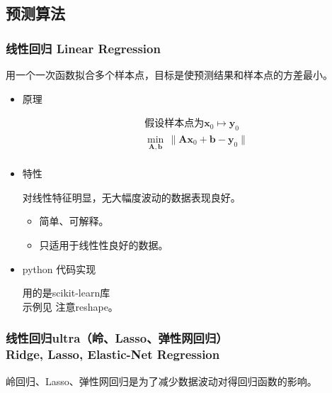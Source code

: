 \documentclass{article}
\begin{document}
\newpage



\subsection{预测算法}

\subsubsection{线性回归 Linear Regression}

用一个一次函数拟合多个样本点，目标是使预测结果和样本点的方差最小。

\begin{itemize}

\item{原理}

\begin{equation}
    \begin{split}
        & \text{假设样本点为$\mathbf{x}_0 \mapsto \mathbf{y}_0$}  \\
        &\min_\mathbf{A, b} \, \lVert \mathbf{Ax}_0 + \mathbf{b} - \mathbf{y}_0 \rVert \\
    \end{split}
\end{equation}

\item{特性}

对线性特征明显，无大幅度波动的数据表现良好。

\begin{itemize}
    \item 简单、可解释。
    \item 只适用于线性性良好的数据。
\end{itemize}

\item{python 代码实现}

用的是scikit-learn库\\
示例见
注意reshape。

\end{itemize}

\subsubsection{线性回归ultra（岭、Lasso、弹性网回归）\\ Ridge, Lasso, Elastic-Net Regression}

岭回归、Lasso、弹性网回归是为了减少数据波动对得回归函数的影响。
\end{document}
